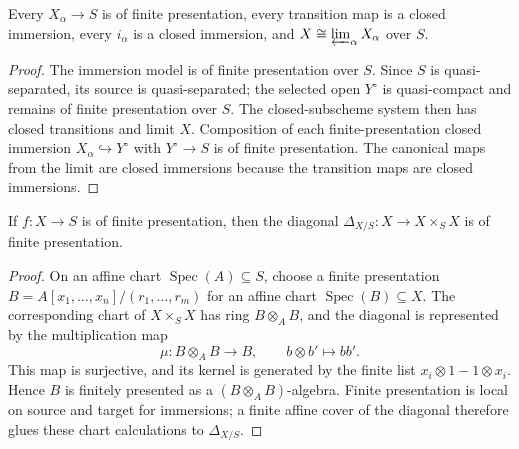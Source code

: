 \begin{lemma}
  \label{lemma:nagata-finite-type-fp-model-system}
  \leanok

  Every $X_\alpha\to S$ is of finite presentation, every transition map is a
  closed immersion, every $i_\alpha$ is a closed immersion, and
  $X\cong\varprojlim_\alpha X_\alpha$ over $S$.
\end{lemma}

\begin{proof}
  \leanok
  The immersion model is of finite presentation over $S$.  Since $S$ is
  quasi-separated, its source is quasi-separated; the selected open
  $Y^\circ$ is quasi-compact and remains of finite presentation over $S$.
  The closed-subscheme system then has closed transitions and limit $X$.
  Composition of each finite-presentation closed immersion
  $X_\alpha\hookrightarrow Y^\circ$ with $Y^\circ\to S$ is of finite
  presentation.  The canonical maps from the limit are closed immersions
  because the transition maps are closed immersions.
\end{proof}

\begin{lemma}
  \label{lemma:nagata-diagonal-finite-presentation}
  \leanok

  If $f\colon X\to S$ is of finite presentation, then the diagonal
  $\Delta_{X/S}\colon X\to X\times_S X$ is of finite presentation.
\end{lemma}

\begin{proof}
  \leanok
  On an affine chart $\operatorname{Spec}(A)\subseteq S$, choose a finite
  presentation
  $B=A[x_1,\ldots,x_n]/(r_1,\ldots,r_m)$ for an affine chart
  $\operatorname{Spec}(B)\subseteq X$.  The corresponding chart of
  $X\times_SX$ has ring $B\otimes_A B$, and the diagonal is represented by the
  multiplication map
  \[
    \mu\colon B\otimes_A B\longrightarrow B,\qquad b\otimes b'\longmapsto bb'.
  \]
  This map is surjective, and its kernel is generated by the finite list
  $x_i\otimes1-1\otimes x_i$.  Hence $B$ is finitely presented as a
  $(B\otimes_A B)$-algebra.  Finite presentation is local on source and
  target for immersions; a finite affine cover of the diagonal therefore
  glues these chart calculations to $\Delta_{X/S}$.
\end{proof}

